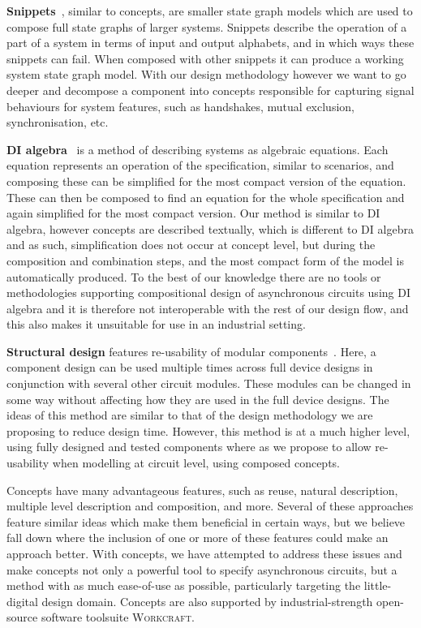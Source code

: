 \documentclass[british, journal]{IEEEtran}
\newcommand{\noun}[1]{\textsc{#1}}
\begin{document}
\textbf{Snippets}~\cite{raey}, similar to concepts, are smaller
state graph models which are used to compose full state graphs of
larger systems. Snippets describe the operation of a part of a system
in terms of input and output alphabets, and in which ways these snippets
can fail. When composed with other snippets it can produce a working
system state graph model. With our design methodology however we want
to go deeper and decompose a component into concepts responsible for
capturing signal behaviours for system features, such as handshakes,
mutual exclusion, synchronisation, etc.

\textbf{DI algebra}~\cite{josephs1993overview} is a method of describing
systems as algebraic equations. Each equation represents an operation
of the specification, similar to scenarios, and composing these can
be simplified for the most compact version of the equation. These
can then be composed to find an equation for the whole specification
and again simplified for the most compact version. Our method is similar
to DI algebra, however concepts are described textually, which is
different to DI algebra and as such, simplification does not occur
at concept level, but during the composition and combination steps,
and the most compact form of the model is automatically produced.
To the best of our knowledge there are no tools or methodologies supporting
compositional design of asynchronous circuits using DI algebra and
it is therefore not interoperable with the rest of our design flow,
and this also makes it unsuitable for use in an industrial setting.

\textbf{Structural design} features re-usability of modular
components~\cite{modular-circuit-design}.
Here, a component design can be used multiple times across full device
designs in conjunction with several other circuit modules. These modules
can be changed in some way without affecting how they are used in
the full device designs. The ideas of this method are similar to that
of the design methodology we are proposing to reduce design time.
However, this method is at a much higher level, using fully designed
and tested components where as we propose to allow re-usability when
modelling at circuit level, using composed concepts.

Concepts have many advantageous features, such as reuse, natural description,
multiple level description and composition, and more.
Several of these approaches feature similar ideas which make them beneficial in
certain ways,
but we believe fall down where the inclusion of one or more of these features
could make an approach better. With concepts,
we have attempted to address these issues and make concepts not only a powerful
tool to specify asynchronous circuits, but a method with as much ease-of-use as
possible, particularly targeting the little-digital design domain.
Concepts are also supported by industrial-strength open-source software
toolsuite \noun{Workcraft}.
\end{document}
